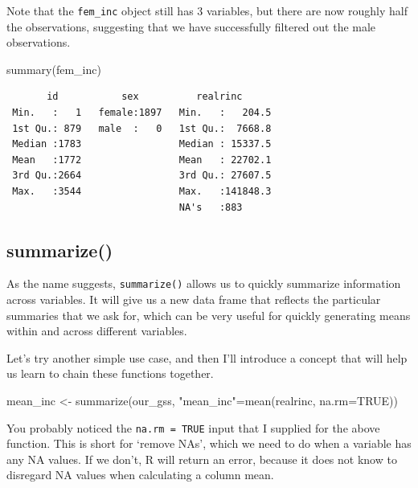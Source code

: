 \documentclass[
  letterpaper,
  DIV=11,
  numbers=noendperiod]{scrreprt}
\newenvironment{Shaded}{\begin{snugshade}}{\end{snugshade}}
\newcommand{\AttributeTok}[1]{\textcolor[rgb]{0.40,0.45,0.13}{#1}}
\newcommand{\ConstantTok}[1]{\textcolor[rgb]{0.56,0.35,0.01}{#1}}
\newcommand{\FunctionTok}[1]{\textcolor[rgb]{0.28,0.35,0.67}{#1}}
\newcommand{\NormalTok}[1]{\textcolor[rgb]{0.00,0.23,0.31}{#1}}
\newcommand{\OtherTok}[1]{\textcolor[rgb]{0.00,0.23,0.31}{#1}}
\newcommand{\StringTok}[1]{\textcolor[rgb]{0.13,0.47,0.30}{#1}}
\begin{document}
Note that the \texttt{fem\_inc} object still has 3 variables, but there
are now roughly half the observations, suggesting that we have
successfully filtered out the male observations.

\begin{Shaded}
\begin{Highlighting}[]
\FunctionTok{summary}\NormalTok{(fem\_inc)}
\end{Highlighting}
\end{Shaded}

\begin{verbatim}
       id           sex          realrinc       
 Min.   :   1   female:1897   Min.   :   204.5  
 1st Qu.: 879   male  :   0   1st Qu.:  7668.8  
 Median :1783                 Median : 15337.5  
 Mean   :1772                 Mean   : 22702.1  
 3rd Qu.:2664                 3rd Qu.: 27607.5  
 Max.   :3544                 Max.   :141848.3  
                              NA's   :883       
\end{verbatim}

\subsection{summarize()}\label{summarize}

As the name suggests, \texttt{summarize()} allows us to quickly
summarize information across variables. It will give us a new data frame
that reflects the particular summaries that we ask for, which can be
very useful for quickly generating means within and across different
variables.

Let's try another simple use case, and then I'll introduce a concept
that will help us learn to chain these functions together.

\begin{Shaded}
\begin{Highlighting}[]
\NormalTok{mean\_inc }\OtherTok{\textless{}{-}} \FunctionTok{summarize}\NormalTok{(our\_gss, }\StringTok{"mean\_inc"}\OtherTok{=}\FunctionTok{mean}\NormalTok{(realrinc, }\AttributeTok{na.rm=}\ConstantTok{TRUE}\NormalTok{))}
\end{Highlighting}
\end{Shaded}

\begin{tcolorbox}[enhanced jigsaw, toprule=.15mm, breakable, rightrule=.15mm, colback=white, colframe=quarto-callout-note-color-frame, colbacktitle=quarto-callout-note-color!10!white, titlerule=0mm, left=2mm, title=\textcolor{quarto-callout-note-color}{\faInfo}\hspace{0.5em}{Note}, bottomrule=.15mm, leftrule=.75mm, opacityback=0, bottomtitle=1mm, arc=.35mm, toptitle=1mm, coltitle=black, opacitybacktitle=0.6]

You probably noticed the \texttt{na.rm\ =\ TRUE} input that I supplied
for the above function. This is short for `remove NAs', which we need to
do when a variable has any NA values. If we don't, R will return an
error, because it does not know to disregard NA values when calculating
a column mean.

\end{tcolorbox}
\end{document}

